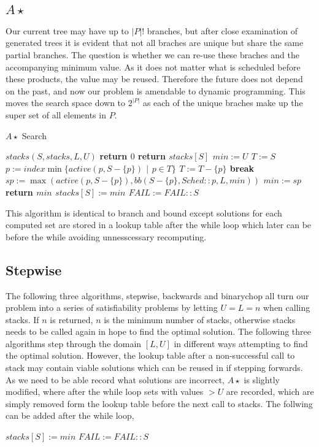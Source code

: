 \subsection{$A\star$}

Our current tree may have up to $|P|!$ branches, but after close examination of
generated trees it is evident that not all braches are unique but share the
same partial branches. The question is whether we can re-use these braches and
the accompanying minimum value. As it does not matter what is scheduled before
these products, the value may be reused. Therefore the future does not depend
on the past, and now our problem is amendable to dynamic programming. This
moves the search space down to $2^|P|$ as each of the unique braches make up
the super set of all elements in $P$.

\begin{algorithm}[H]
\caption{$A\star$ Search}
\label{alg3}
\begin{algorithmic}
\REQUIRE $stacks(S,stacks,L,U)$
\STATE \bf return $0$
\ENDIF
{}
\STATE return $stacks[S]$
\ENDIF
\STATE $min := U$
\STATE $T := S$
\STATE $p := index \min \{active(p,S-\{p\})$ $|$ $p \in T\}$
\STATE $T := T - \{p\}$
\STATE \bf break
\ENDIF
\STATE $sp := \max(active(p,S-\{p\}),bb(S-\{p\},Sched::p,L,min))$
\STATE $min := sp$
\ENDIF
\STATE \bf return $min$
\ENDWHILE
\STATE $stacks[S] := min$
\STATE $FAIL := FAIL::S$
\ENDIF
\ENSURE
\end{algorithmic}
\end{algorithm}

This algorithm is identical to branch and bound except solutions for each
computed set are stored in a lookup table after the while loop which later can
be before the while avoiding unnesscessary recomputing.

\subsection{Stepwise}

The following three algorithms, stepwise, backwards and binarychop all turn our
problem into a series of satisfiability problems by letting $U=L=n$ when
calling stacks. If $n$ is returned, $n$ is the minimum number of stacks,
otherwise stacks needs to be called again in hope to find the optimal solution.
The following three algorithms step through the domain $[L,U]$ in different
ways attempting to find the optimal solution. However, the lookup table after a
non-successful call to stack may contain viable solutions which can be reused
in if stepping forwards. As we need to be able record what solutions are
incorrect, $A\star$ is slightly modified, where after the while loop sets with
values $> U$ are recorded, which are simply removed form the lookup table
before the next call to stacks. The follwing can be added after the while loop, 
\\
\begin{algorithmic}
\STATE $stacks[S] := min$
\STATE $FAIL := FAIL::S$
\ENDIF
\end{algorithmic}

